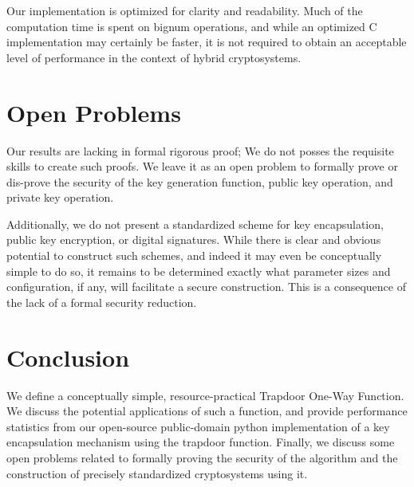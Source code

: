 \documentclass[preprint]{iacrtrans}
\begin{document}
Our implementation is optimized for clarity and readability. Much of the computation time is spent on bignum operations, and while an optimized C implementation may certainly be faster, it is not required to obtain an acceptable level of performance in the context of hybrid cryptosystems. 

\section{Open Problems}
Our results are lacking in formal rigorous proof; We do not posses the requisite skills to create such proofs. We leave it as an open problem to formally prove or dis-prove the security of the key generation function, public key operation, and private key operation.

Additionally, we do not present a standardized scheme for key encapsulation, public key encryption, or digital signatures. While there is clear and obvious potential to construct such schemes, and indeed it may even be conceptually simple to do so, it remains to be determined exactly what parameter sizes and configuration, if any, will facilitate a secure construction. This is a consequence of the lack of a formal security reduction.

\section{Conclusion}
We define a conceptually simple, resource-practical Trapdoor One-Way Function. We discuss the potential applications of such a function, and provide performance statistics from our open-source public-domain python implementation of a key encapsulation mechanism using the trapdoor function. Finally, we discuss some open problems related to formally proving the security of the algorithm and the construction of precisely standardized cryptosystems using it.
\end{document}
